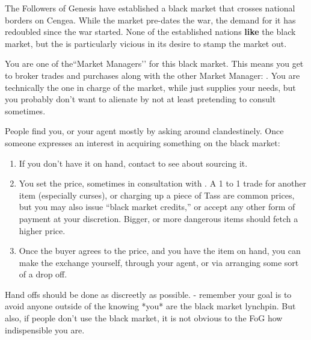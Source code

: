\documentclass[green]{GL2020}
\begin{document}
\name{\gBMRun{}}

The Followers of Genesis have established a black market that crosses national borders on Cengea. While the market pre-dates the war, the demand for it has redoubled since the war started. None of the established nations \textbf{like} the black market, but the \pTech{} is particularly vicious in its desire to stamp the market out.

You are one of the``Market Managers’’ for this black market. This means you get to broker trades and purchases along with the other Market Manager: \cChupInventor{\full}. You are technically the one in charge of the market, while \cChupInventor{} just supplies your needs, but you probably don’t want to alienate \cChupInventor{\them} by not at least pretending to consult \cChupInventor{\them} sometimes.

People find you, or your agent \cLibAssist{} mostly by asking around clandestinely. Once someone expresses an interest in acquiring something on the black market:

\begin{enumerate}
  \item If you don’t have it on hand, contact \cChupInventor{} to see about sourcing it.
  \item You set the price, sometimes in consultation with \cChupInventor{}. A 1 to 1 trade for another item (especially curses), or charging up a piece of Tass are common prices, but you may also issue “black market credits,” or accept any other form of payment at your discretion. Bigger, or more dangerous items should fetch a higher price.
  \item Once the buyer agrees to the price, and you have the item on hand, you can make the exchange yourself, through your agent, or via arranging some sort of a drop off.
\end{enumerate}

Hand offs should be done as discreetly as possible. - remember your goal is to avoid anyone outside of the \cFoG{} knowing *you* are the black market lynchpin. But also, if people don’t use the black market, it is not obvious to the FoG how indispensible you are.
\end{document}
